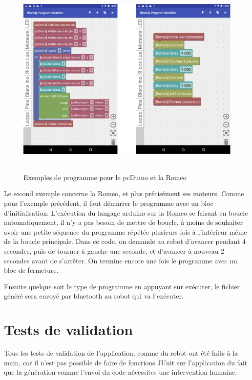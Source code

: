 \documentclass[12pt,francais]{report}
\begin{document}
\begin{figure}[!h]
\begin{addmargin}[-5.5em]{1em}
\includegraphics[scale=0.4]{./images/exemplePcDuino.png}~\\[1.5cm]
\caption{Exemples de programme pour le pcDuino et la Romeo}
\end{addmargin}
\end{figure}

\bigskip

Le second exemple concerne la Romeo, et plus précisément ses moteurs. Comme pour l'exemple précédent, il faut démarrer le programme avec un bloc d'initialisation. L'exécution du langage arduino sur la Romeo se faisant en boucle automatiquement, il n'y a pas besoin de mettre de boucle, à moins de souhaiter avoir une petite séquence du programme répétée plusieurs fois à l'intérieur même de la boucle principale. Dans ce code, on demande au robot d'avancer pendant 4 secondes, puis de tourner à gauche une seconde, et d'avancer à nouveau 2 secondes avant de s'arrêter. On termine encore une fois le programme avec un bloc de fermeture.

Ensuite quelque soit le type de programme en appuyant sur exécuter, le fichier généré sera envoyé par bluetooth au robot qui va l'exécuter.

\section*{Tests de validation}

Tous les tests de validation de l'application, comme du robot ont été faits à la main, car il n'est pas possible de faire de fonctions JUnit sur l'application du fait que la génération comme l'envoi du code nécessites une intervention humaine.
\end{document}
